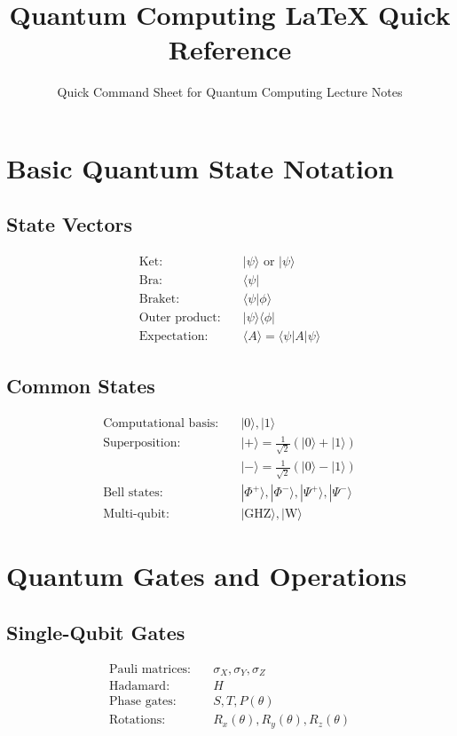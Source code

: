 \documentclass[12pt]{article}
\title{\textbf{\Large Quantum Computing LaTeX Quick Reference}}
\author{Quick Command Sheet for Quantum Computing Lecture Notes}
\date{}
\newcommand{\ket}[1]{|#1\rangle}
\newcommand{\bra}[1]{\langle#1|}
\newcommand{\braket}[2]{\langle#1|#2\rangle}
\newcommand{\ketbra}[2]{|#1\rangle\langle#2|}
\newcommand{\expectation}[1]{\langle#1\rangle}
\newcommand{\qzero}{\ket{0}}
\newcommand{\qone}{\ket{1}}
\newcommand{\qplus}{\ket{+}}
\newcommand{\qminus}{\ket{-}}
\newcommand{\qpsi}{\ket{\psi}}
\newcommand{\bellphi}{\ket{\Phi^+}}
\newcommand{\bellphim}{\ket{\Phi^-}}
\newcommand{\bellpsi}{\ket{\Psi^+}}
\newcommand{\bellpsim}{\ket{\Psi^-}}
\newcommand{\GHZ}{\ket{\text{GHZ}}}
\newcommand{\Wstate}{\ket{\text{W}}}
\newcommand{\pauliX}{\sigma_X}
\newcommand{\pauliY}{\sigma_Y}
\newcommand{\pauliZ}{\sigma_Z}
\newcommand{\hadamard}{H}
\newcommand{\rx}[1]{R_x(#1)}
\newcommand{\ry}[1]{R_y(#1)}
\newcommand{\rz}[1]{R_z(#1)}
\newcommand{\phaseS}{S}
\newcommand{\phaseT}{T}
\newcommand{\phaseP}[1]{P(#1)}
\theoremstyle{definition}
\theoremstyle{remark}
\begin{document}
\maketitle
\thispagestyle{fancy}

\begin{multicols}{2}

\section{Basic Quantum State Notation}

\subsection{State Vectors}
\begin{align}
\text{Ket:} &\quad \ket{\psi} \text{ or } \qpsi \\
\text{Bra:} &\quad \bra{\psi} \\
\text{Braket:} &\quad \braket{\psi}{\phi} \\
\text{Outer product:} &\quad \ketbra{\psi}{\phi} \\
\text{Expectation:} &\quad \expectation{A} = \braket{\psi}{A|\psi}
\end{align}

\subsection{Common States}
\begin{align}
\text{Computational basis:} &\quad \qzero, \qone \\
\text{Superposition:} &\quad \qplus = \frac{1}{\sqrt{2}}(\qzero + \qone) \\
&\quad \qminus = \frac{1}{\sqrt{2}}(\qzero - \qone) \\
\text{Bell states:} &\quad \bellphi, \bellphim, \bellpsi, \bellpsim \\
\text{Multi-qubit:} &\quad \GHZ, \Wstate
\end{align}

\section{Quantum Gates and Operations}

\subsection{Single-Qubit Gates}
\begin{align}
\text{Pauli matrices:} &\quad \pauliX, \pauliY, \pauliZ \\
\text{Hadamard:} &\quad \hadamard \\
\text{Phase gates:} &\quad \phaseS, \phaseT, \phaseP{\theta} \\
\text{Rotations:} &\quad \rx{\theta}, \ry{\theta}, \rz{\theta}
\end{align}


\end{multicols}
\end{document}

